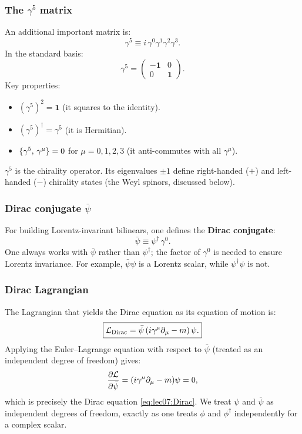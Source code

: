 \documentclass[../main.tex]{subfiles}
\begin{document}
\subsubsection*{The $\gamma^5$ matrix}

An additional important matrix is:
\begin{equation}
  \gamma^5 \equiv i\,\gamma^0\gamma^1\gamma^2\gamma^3.
  \label{eq:lec07:gamma5-def}
\end{equation}
In the standard basis:
\begin{equation}
  \gamma^5 = \begin{pmatrix}-\mathbf{1} & 0 \\ 0 & \mathbf{1}\end{pmatrix}.
  \label{eq:lec07:gamma5-matrix}
\end{equation}
Key properties:
\begin{itemize}
  \item $(\gamma^5)^2 = \mathbf{1}$ (it squares to the identity).
  \item $(\gamma^5)^\dagger = \gamma^5$ (it is Hermitian).
  \item $\{\gamma^5,\, \gamma^\mu\} = 0$ for $\mu = 0,1,2,3$ (it anti-commutes with all $\gamma^\mu$).
\end{itemize}
$\gamma^5$ is the chirality operator.  Its eigenvalues $\pm1$ define right-handed ($+$) and left-handed ($-$) chirality states (the Weyl spinors, discussed below).

\subsubsection*{Dirac conjugate $\bar\psi$}

For building Lorentz-invariant bilinears, one defines the \textbf{Dirac conjugate}:
\begin{equation}
  \bar\psi \equiv \psi^\dagger\,\gamma^0.
  \label{eq:lec07:Dirac-conjugate}
\end{equation}
One always works with $\bar\psi$ rather than $\psi^\dagger$; the factor of $\gamma^0$ is needed to ensure Lorentz invariance.  For example, $\bar\psi\psi$ is a Lorentz scalar, while $\psi^\dagger\psi$ is not.

\subsubsection*{Dirac Lagrangian}

The Lagrangian that yields the Dirac equation as its equation of motion is:
\begin{equation}
  \boxed{\mathcal{L}_{\rm Dirac} = \bar\psi\,(i\gamma^\mu\partial_\mu - m)\,\psi.}
  \label{eq:lec07:Dirac-Lagrangian}
\end{equation}
Applying the Euler--Lagrange equation with respect to $\bar\psi$ (treated as an independent degree of freedom) gives:
\[
  \frac{\partial\mathcal{L}}{\partial\bar\psi} = (i\gamma^\mu\partial_\mu - m)\psi = 0,
\]
which is precisely the Dirac equation \eqref{eq:lec07:Dirac}.  We treat $\psi$ and $\bar\psi$ as independent degrees of freedom, exactly as one treats $\phi$ and $\phi^\dagger$ independently for a complex scalar.
\end{document}
